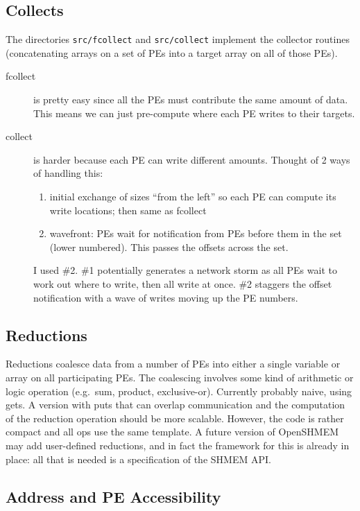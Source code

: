 \documentclass[english]{article}
\begin{document}
\subsection{Collects}

The directories \texttt{src/fcollect} and \texttt{src/collect}
implement the collector routines (concatenating arrays on a set of PEs
into a target array on all of those PEs).

\begin{description}
\item[fcollect] is pretty easy since all the PEs must contribute the
  same amount of data. This means we can just pre-compute where each PE
  writes to their targets.
\item[collect] is harder because each PE can write different
  amounts. Thought of 2 ways of handling this:
  \begin{enumerate}
  \item initial exchange of sizes ``from the left'' so each PE can
    compute its write locations; then same as fcollect
  \item wavefront: PEs wait for notification from PEs before them in the
    set (lower numbered). This passes the offsets across the set.
  \end{enumerate}
  I used \#2. \#1 potentially generates a network storm as all PEs wait
  to work out where to write, then all write at once. \#2 staggers the
  offset notification with a wave of writes moving up the PE numbers.
\end{description}

\subsection{Reductions}

Reductions coalesce data from a number of PEs into either a single
variable or array on all participating PEs. The coalescing involves
some kind of arithmetic or logic operation (e.g.\ sum, product,
exclusive-or).  Currently probably naive, using gets. A version with
puts that can overlap communication and the computation of the
reduction operation should be more scalable. However, the code is
rather compact and all ops use the same template. A future version of
OpenSHMEM may add user-defined reductions, and in fact the framework
for this is already in place: all that is needed is a specification of
the SHMEM API.

\subsection{Address and PE Accessibility}
\end{document}
